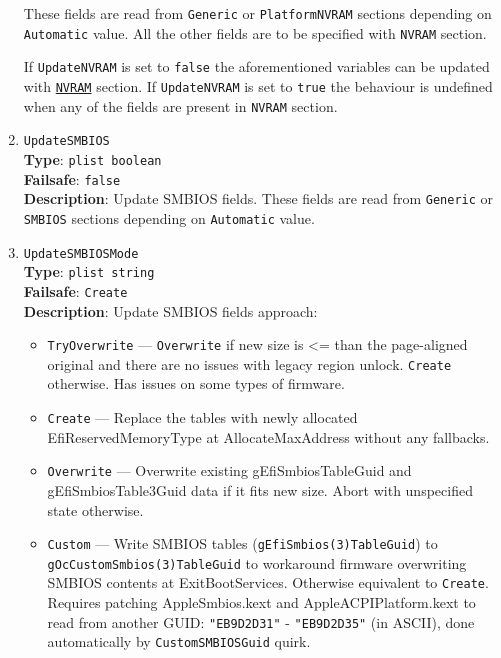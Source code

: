 \documentclass[]{article}
\providecommand{\tightlist}{%
  \setlength{\itemsep}{0pt}\setlength{\parskip}{0pt}}
\begin{document}
\begin{enumerate}
  These fields are read from \texttt{Generic} or \texttt{PlatformNVRAM} sections
  depending on \texttt{Automatic} value. All the other fields are
  to be specified with \texttt{NVRAM} section.

  If \texttt{UpdateNVRAM} is set to \texttt{false} the aforementioned
  variables can be updated with \hyperref[nvram]{\texttt{NVRAM}}
  section. If \texttt{UpdateNVRAM} is set to \texttt{true} the behaviour is
  undefined when any of the fields are present in \texttt{NVRAM} section.
\item
  \texttt{UpdateSMBIOS}\\
  \textbf{Type}: \texttt{plist\ boolean}\\
  \textbf{Failsafe}: \texttt{false}\\
  \textbf{Description}: Update SMBIOS fields. These fields are read from
  \texttt{Generic} or \texttt{SMBIOS} sections depending on
  \texttt{Automatic} value.
\item
  \texttt{UpdateSMBIOSMode}\\
  \textbf{Type}: \texttt{plist\ string}\\
  \textbf{Failsafe}: \texttt{Create}\\
  \textbf{Description}: Update SMBIOS fields approach:

  \begin{itemize}
  \tightlist
  \item
    \texttt{TryOverwrite} --- \texttt{Overwrite} if new size is \textless{}= than
    the page-aligned original and there are no issues with legacy region
    unlock. \texttt{Create} otherwise. Has issues on some types of firmware.
  \item
    \texttt{Create} --- Replace the tables with newly allocated
    EfiReservedMemoryType at AllocateMaxAddress without any fallbacks.
  \item
    \texttt{Overwrite} --- Overwrite existing gEfiSmbiosTableGuid and
    gEfiSmbiosTable3Guid data if it fits new size. Abort with
    unspecified state otherwise.
  \item
    \texttt{Custom} --- Write SMBIOS tables
    (\texttt{gEfiSmbios(3)TableGuid}) to \texttt{gOcCustomSmbios(3)TableGuid}
    to workaround firmware overwriting SMBIOS contents at
    ExitBootServices. Otherwise equivalent to \texttt{Create}. Requires
    patching AppleSmbios.kext and AppleACPIPlatform.kext to read from
    another GUID: \texttt{"EB9D2D31"} - \texttt{"EB9D2D35"} (in ASCII),
    done automatically by \texttt{CustomSMBIOSGuid} quirk.
  \end{itemize}


\end{enumerate}
\end{document}
